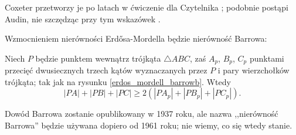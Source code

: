 Coxeter przetworzy je po latach w ćwiczenie dla Czytelnika \cite[s. 25]{coxeter_1967};
podobnie postąpi Audin, nie szczędząc przy tym wskazówek \cite[s. 102]{audin_2003}.


Wzmocnieniem nierówności Erdősa-Mordella będzie nierówność Barrowa:


\begin{theorem}
    Niech $P$ będzie punktem wewnątrz trójkąta $\triangle ABC$, zaś $A_p$, $B_p$, $C_p$ punktami przecięć dwusiecznych trzech kątów wyznaczanych przez $P$ i pary wierzchołków trójkąta; tak jak na rysunku \ref{erdos_mordell_barrowb}.
    Wtedy
    \begin{equation}
        |PA| + |PB| + |PC| \ge 2 (|PA_p| + |PB_p| + |PC_p|).
    \end{equation}
\end{theorem}

Dowód Barrowa zostanie opublikowany w 1937 roku, ale nazwa ,,nierówność Barrowa'' będzie używana dopiero od 1961 roku; nie wiemy, co się wtedy stanie.

%